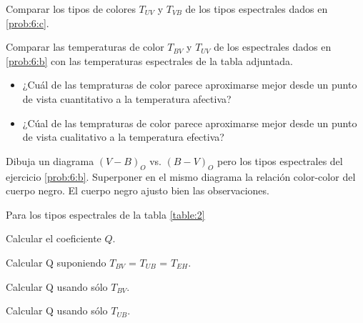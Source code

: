 \documentclass[12pt,a4paper]{practice}
\begin{document}
\begin{problem}
        \begin{problempart}\label{prob:6:d}
            Comparar los tipos de colores $T_{UV}$ y $T_{VB}$ de los tipos espectrales dados en \ref{prob:6:c}.
        \end{problempart}

        \begin{problempart}\label{prob:6:e}
            Comparar las temperaturas de color $T_{BV}$ y $T_{UV}$ de los espectrales dados en \ref{prob:6:b} con las temperaturas espectrales de la tabla adjuntada.

            \begin{itemize}
                \item ¿Cuál de las tempraturas de color parece aproximarse mejor desde un punto de vista cuantitativo a la temperatura afectiva?
                \item ¿Cúal de las tempraturas de color parece aproximarse mejor desde un punto de vista cualitativo a la temperatura efectiva?
            \end{itemize}
        \end{problempart}
    \end{problem}

    \begin{problem}\label{prob:7}
        Dibuja un diagrama $\left(V-B\right)_O$ vs. $\left(B-V\right)_O$ pero los tipos espectrales del ejercicio \ref{prob:6:b}. Superponer en el mismo diagrama la relación color-color del cuerpo negro. El cuerpo negro ajusto bien las observaciones.
    \end{problem}

    \begin{problem}\label{prob:8}
        Para los tipos espectrales de la tabla \ref{table:2}

            \begin{problempart}\label{prob:8:a}
                Calcular el coeficiente $Q$.
            \end{problempart}

            \begin{problempart}\label{prob:8:b}
                Calcular Q suponiendo $T_{BV}$ = $T_{UB}$ = $T_{EH}$.
            \end{problempart}

            \begin{problempart}\label{prob:8:c}
                Calcular Q usando sólo $T_{BV}$.
            \end{problempart}

            \begin{problempart}\label{prob:8:d}
                Calcular Q usando sólo $T_{UB}$.
            \end{problempart}
    \end{problem}
\end{document}
